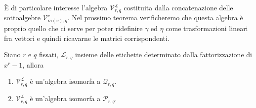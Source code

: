 È di particolare interesse l'algebra $\mathcal{V}_{r,q}^{\mathscr{L}}$ costituita dalla concatenazione delle 
sottoalgebre $\mathcal{V}_{m(v), q}^{c}$. Nel prossimo teorema verificheremo che questa algebra è proprio quello che ci serve per poter ridefinire $\gamma$ ed $\eta$ come trasformazioni lineari fra vettori e quindi ricavarne le matrici corrispondenti.
\begin{teorema}
   Siano $r$ e $q$ fissati, $\mathscr{L}_{r,q}$ insieme delle etichette determinato dalla fattorizzazione di $x^r-1$, allora
   \begin{enumerate}
      \item $\mathcal{V}_{r,q}^{\mathscr{L}}$ è un'algebra isomorfa a $\mathcal{Q}_{r,q}$.
      \item $\mathcal{V}_{r,q}^{\mathscr{L}}$ è un'algebra isomorfa a $\mathcal{P}_{r,q}$.
   \end{enumerate} 
\end{teorema}
